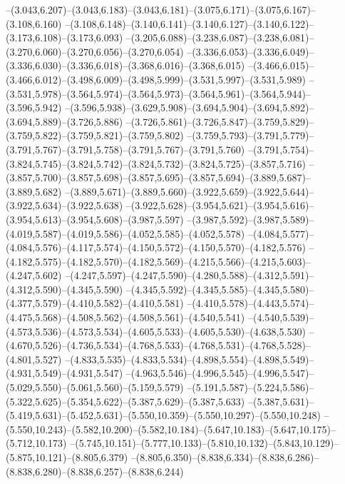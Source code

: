   --(3.043,6.207)--(3.043,6.183)--(3.043,6.181)--(3.075,6.171)--(3.075,6.167)--(3.108,6.160)%
  --(3.108,6.148)--(3.140,6.141)--(3.140,6.127)--(3.140,6.122)--(3.173,6.108)--(3.173,6.093)%
  --(3.205,6.088)--(3.238,6.087)--(3.238,6.081)--(3.270,6.060)--(3.270,6.056)--(3.270,6.054)%
  --(3.336,6.053)--(3.336,6.049)--(3.336,6.030)--(3.336,6.018)--(3.368,6.016)--(3.368,6.015)%
  --(3.466,6.015)--(3.466,6.012)--(3.498,6.009)--(3.498,5.999)--(3.531,5.997)--(3.531,5.989)%
  --(3.531,5.978)--(3.564,5.974)--(3.564,5.973)--(3.564,5.961)--(3.564,5.944)--(3.596,5.942)%
  --(3.596,5.938)--(3.629,5.908)--(3.694,5.904)--(3.694,5.892)--(3.694,5.889)--(3.726,5.886)%
  --(3.726,5.861)--(3.726,5.847)--(3.759,5.829)--(3.759,5.822)--(3.759,5.821)--(3.759,5.802)%
  --(3.759,5.793)--(3.791,5.779)--(3.791,5.767)--(3.791,5.758)--(3.791,5.767)--(3.791,5.760)%
  --(3.791,5.754)--(3.824,5.745)--(3.824,5.742)--(3.824,5.732)--(3.824,5.725)--(3.857,5.716)%
  --(3.857,5.700)--(3.857,5.698)--(3.857,5.695)--(3.857,5.694)--(3.889,5.687)--(3.889,5.682)%
  --(3.889,5.671)--(3.889,5.660)--(3.922,5.659)--(3.922,5.644)--(3.922,5.634)--(3.922,5.638)%
  --(3.922,5.628)--(3.954,5.621)--(3.954,5.616)--(3.954,5.613)--(3.954,5.608)--(3.987,5.597)%
  --(3.987,5.592)--(3.987,5.589)--(4.019,5.587)--(4.019,5.586)--(4.052,5.585)--(4.052,5.578)%
  --(4.084,5.577)--(4.084,5.576)--(4.117,5.574)--(4.150,5.572)--(4.150,5.570)--(4.182,5.576)%
  --(4.182,5.575)--(4.182,5.570)--(4.182,5.569)--(4.215,5.566)--(4.215,5.603)--(4.247,5.602)%
  --(4.247,5.597)--(4.247,5.590)--(4.280,5.588)--(4.312,5.591)--(4.312,5.590)--(4.345,5.590)%
  --(4.345,5.592)--(4.345,5.585)--(4.345,5.580)--(4.377,5.579)--(4.410,5.582)--(4.410,5.581)%
  --(4.410,5.578)--(4.443,5.574)--(4.475,5.568)--(4.508,5.562)--(4.508,5.561)--(4.540,5.541)%
  --(4.540,5.539)--(4.573,5.536)--(4.573,5.534)--(4.605,5.533)--(4.605,5.530)--(4.638,5.530)%
  --(4.670,5.526)--(4.736,5.534)--(4.768,5.533)--(4.768,5.531)--(4.768,5.528)--(4.801,5.527)%
  --(4.833,5.535)--(4.833,5.534)--(4.898,5.554)--(4.898,5.549)--(4.931,5.549)--(4.931,5.547)%
  --(4.963,5.546)--(4.996,5.545)--(4.996,5.547)--(5.029,5.550)--(5.061,5.560)--(5.159,5.579)%
  --(5.191,5.587)--(5.224,5.586)--(5.322,5.625)--(5.354,5.622)--(5.387,5.629)--(5.387,5.633)%
  --(5.387,5.631)--(5.419,5.631)--(5.452,5.631)--(5.550,10.359)--(5.550,10.297)--(5.550,10.248)%
  --(5.550,10.243)--(5.582,10.200)--(5.582,10.184)--(5.647,10.183)--(5.647,10.175)--(5.712,10.173)%
  --(5.745,10.151)--(5.777,10.133)--(5.810,10.132)--(5.843,10.129)--(5.875,10.121)--(8.805,6.379)%
  --(8.805,6.350)--(8.838,6.334)--(8.838,6.286)--(8.838,6.280)--(8.838,6.257)--(8.838,6.244)%
